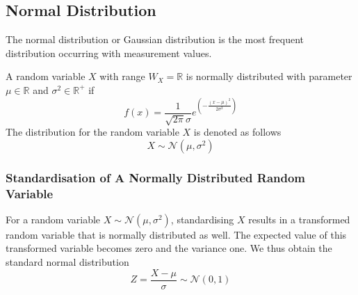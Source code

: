 \documentclass[11pt]{article}
\theoremstyle{definition}
\newcommand*\R{\mathbb{R}}
\newcommand*\N[1]{\mathcal{N}\left(#1\right)}
\begin{document}
\subsection{Normal Distribution}
The normal distribution or Gaussian distribution is the most frequent distribution occurring with measurement values.
\begin{definition}
	A random variable $X$ with range $W_X = \R$ is normally distributed with parameter $\mu \in \R$ and $\sigma^2\in\R^+$ if
	\begin{equation*}
	f(x) = \frac{1}{\sqrt{2\pi} \sigma} e^{\left( -\frac{(x-\mu)^2}{2\sigma^2} \right)}
	\end{equation*}
	The distribution for the random variable $X$ is denoted as follows
	\begin{equation*}
		X \sim \N{\mu,\sigma^2}
	\end{equation*}
\end{definition}

\subsubsection{Standardisation of A Normally Distributed Random Variable}
\begin{definition}
	For a random variable $ X\sim\N{\mu,\sigma^2} $, standardising $X$ results in a transformed random variable that is normally distributed as well. The expected value of this transformed variable becomes zero and the variance one. We thus obtain the standard normal distribution
	\begin{equation*}
		Z = \frac{X - \mu}{\sigma} \sim \N{0,1}
	\end{equation*}
\end{definition}
\end{document}
